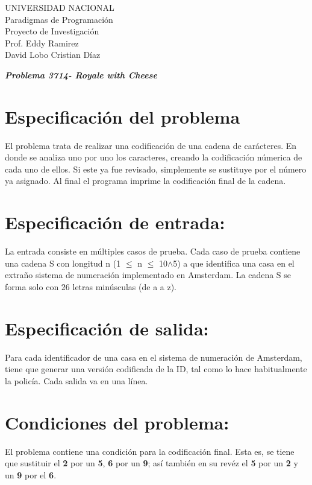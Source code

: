 \documentclass[12pt,a4paper]{article}
\begin{document}
\begin{center}
\begin{LARGE}
UNIVERSIDAD NACIONAL \\
Paradigmas de Programaci\'on \\
Proyecto de Investigaci\'on \\
Prof. Eddy Ramirez \\
David Lobo
Cristian Díaz
\end{LARGE}
\end{center}

\begin{center}
{\Huge{\textbf{\em Problema 3714- Royale with Cheese}}}
\end{center}

\section{Especificación del problema}
El problema trata de realizar una codificaci\'on de una cadena de car\'acteres. En donde se analiza uno por uno los caracteres, creando la codificaci\'on n\'umerica de cada uno de ellos. Si este ya fue revisado, simplemente se sustituye por el n\'umero ya asignado. Al final el programa imprime la codificaci\'on final de la cadena.

\section{Especificaci\'on de entrada: }
La entrada consiste en m\'ultiples casos de prueba. Cada caso de prueba contiene una cadena S con longitud n (1 $\leq$ n $\leq$ 10$\wedge$5) a que identifica una casa en el extraño sistema de numeraci\'on implementado en Amsterdam. La cadena S se forma solo con 26 letras min\'usculas (de a a z).

\section{Especificaci\'on de salida: }
Para cada identificador de una casa en el sistema de numeraci\'on de Amsterdam, tiene que generar una versi\'on codificada de la ID, tal como lo hace habitualmente la polic\'ia. Cada salida va en una l\'inea.

\section{Condiciones del problema: }
El problema contiene una condici\'on para la codificaci\'on final. Esta es, se tiene que sustituir el {\bf 2} por un {\bf 5}, {\bf 6} por un {\bf 9}; as\'i tambi\'en en su rev\'ez el {\bf 5} por un {\bf 2} y un {\bf 9} por el {\bf 6}.
\end{document}
